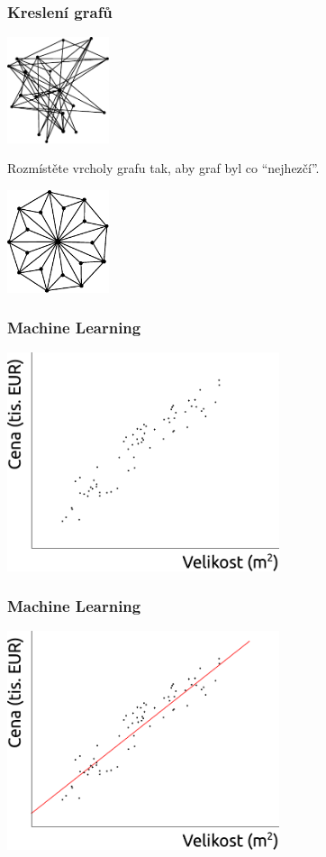 \documentclass[red,professionalfont]{beamer}
\theoremstyle{definition}
\newcommand{\0}{\mbox{${\bf 0}$}}
\begin{document}
\begin{frame}[fragile]\frametitle{Kreslení grafů}
\begin{center}
 \includegraphics[width=3cm]{graph-annealing-initial.pdf}
\end{center}\pause
\begin{block}{}
\begin{center}
 Rozmístěte vrcholy grafu tak, aby graf byl co ``nejhezčí''.
\end{center}
\end{block}\pause
\begin{center}
 \includegraphics[width=3cm]{graph-annealing-final.pdf}
\end{center}
\end{frame}

\begin{frame}[fragile]\frametitle{Machine Learning}
\begin{center}
 \includegraphics[width=8cm]{linear-regression-initial.pdf}
\end{center}
\end{frame}
\begin{frame}\frametitle{Machine Learning}
\begin{center}
 \includegraphics[width=8cm]{linear-regression-final.pdf}
\end{center}
\end{frame}
\end{document}
